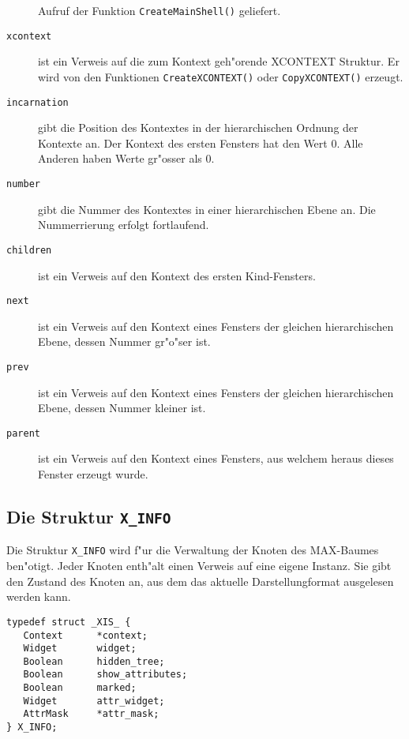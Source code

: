 \begin{description}
   Aufruf der Funktion {\tt CreateMainShell()} geliefert.
\item[\tt xcontext]
   ist ein Verweis auf die zum Kontext geh"orende XCONTEXT Struktur.
   Er wird von den Funktionen {\tt CreateXCONTEXT()} oder
   {\tt CopyXCONTEXT()} erzeugt.
\item[\tt incarnation]
   gibt die Position des Kontextes in der hierarchischen Ordnung der
   Kontexte an. Der Kontext des ersten Fensters hat den Wert 0. Alle
   Anderen haben Werte gr"osser als 0.
\item[\tt number]
   gibt die Nummer des Kontextes in einer hierarchischen Ebene an.
   Die Nummerrierung erfolgt fortlaufend.
\item[\tt children]
   ist ein Verweis auf den Kontext des ersten Kind-Fensters.
\item[\tt next]
   ist ein Verweis auf den Kontext eines Fensters der gleichen
   hierarchischen Ebene, dessen Nummer gr"o"ser ist.
\item[\tt prev]
   ist ein Verweis auf den Kontext eines Fensters der gleichen
   hierarchischen Ebene, dessen Nummer kleiner ist.
\item[\tt parent]
   ist ein Verweis auf den Kontext eines Fensters, aus welchem heraus
   dieses Fenster erzeugt wurde.
   
\end{description}

\subsection{Die Struktur {\tt X\_INFO}}

Die Struktur {\tt X\_INFO} wird f"ur die Verwaltung der Knoten des
MAX-Baumes ben"otigt. Jeder Knoten enth"alt einen Verweis auf eine
eigene Instanz. Sie gibt den Zustand des Knoten an, aus dem das 
aktuelle Darstellungformat ausgelesen werden kann.

\begin{verbatim}
typedef struct _XIS_ {
   Context      *context; 
   Widget       widget; 
   Boolean      hidden_tree; 
   Boolean      show_attributes; 
   Boolean      marked; 
   Widget       attr_widget; 
   AttrMask     *attr_mask;
} X_INFO;
\end{verbatim}

